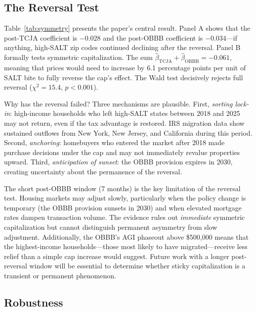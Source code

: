 \documentclass[12pt]{article}
\begin{document}
\subsection{The Reversal Test}



Table~\ref{tab:symmetry} presents the paper's central result. Panel A shows that the post-TCJA coefficient is $-0.028$ and the post-OBBB coefficient is $-0.034$---if anything, high-SALT zip codes continued declining after the reversal. Panel B formally tests symmetric capitalization. The sum $\hat{\beta}_{\text{TCJA}} + \hat{\beta}_{\text{OBBB}} = -0.061$, meaning that prices would need to increase by 6.1 percentage points per unit of SALT bite to fully reverse the cap's effect. The Wald test decisively rejects full reversal ($\chi^2 = 15.4$, $p < 0.001$).

Why has the reversal failed? Three mechanisms are plausible. First, \textit{sorting lock-in}: high-income households who left high-SALT states between 2018 and 2025 may not return, even if the tax advantage is restored. IRS migration data show sustained outflows from New York, New Jersey, and California during this period. Second, \textit{anchoring}: homebuyers who entered the market after 2018 made purchase decisions under the cap and may not immediately revalue properties upward. Third, \textit{anticipation of sunset}: the OBBB provision expires in 2030, creating uncertainty about the permanence of the reversal.

The short post-OBBB window (7 months) is the key limitation of the reversal test. Housing markets may adjust slowly, particularly when the policy change is temporary (the OBBB provision sunsets in 2030) and when elevated mortgage rates dampen transaction volume. The evidence rules out \textit{immediate} symmetric capitalization but cannot distinguish permanent asymmetry from slow adjustment. Additionally, the OBBB's AGI phaseout above \$500,000 means that the highest-income households---those most likely to have migrated---receive less relief than a simple cap increase would suggest. Future work with a longer post-reversal window will be essential to determine whether sticky capitalization is a transient or permanent phenomenon.

\subsection{Robustness}


\end{document}
